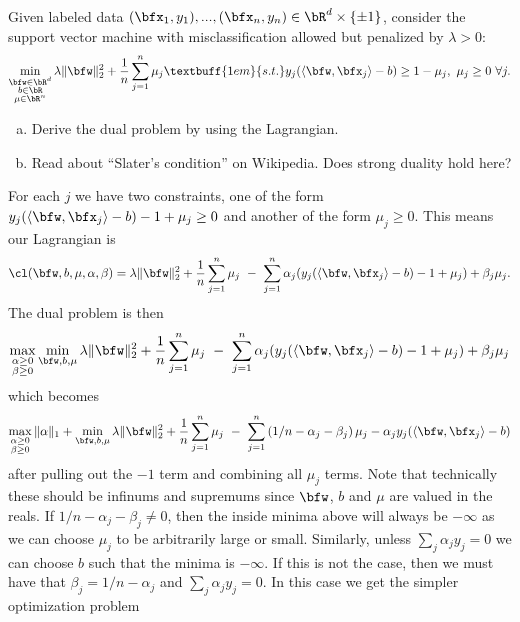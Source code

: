 \begin{homework}[e]
  \prob Given labeled data $(\bfx_1,y_1),...,(\bfx_n,y_n)\in \bR^d \times \{\pm 1\}$, consider the support vector machine with misclassification allowed but penalized by $\lambda > 0$:
  \begin{align*}
    \min_{\substack{\bfw\in \bR^d\\ b\in \bR\\\mu\in \bR^n}} \lambda \|\bfw\|^2_2 + \frac{1}{n}\sum^n_{j=1} \mu_j \textbuff{1em}{s.t.} y_j(\langle \bfw, \bfx_j \rangle - b) \geq 1 - \mu_j, ~ \mu_j \geq 0 ~\forall j.
  \end{align*}
  \begin{enumerate}[(a)]
    \item Derive the dual problem by using the Lagrangian.
    \item Read about ``Slater's condition'' on Wikipedia. Does strong duality hold here?
  \end{enumerate}
  \begin{prf}
    For each $j$ we have two constraints, one of the form $y_j(\langle \bfw, \bfx_j \rangle - b) - 1 + \mu_j\geq 0$ and another of the form $\mu_j \geq 0$. This means our Lagrangian is
    \begin{align*}
      \cl(\bfw, b,\mu,\alpha,\beta) = \lambda \|\bfw\|^2_2 + \frac{1}{n} \sum_{j=1}^n \mu_j ~-~ \sum_{j=1}^n \alpha_j(y_j(\langle \bfw, \bfx_j\rangle - b) -1 + \mu_j) + \beta_j\mu_j.
    \end{align*}
    The dual problem is then
    \begin{align*}
      \max_{\substack{\alpha \geq 0 \\ \beta\geq 0}} \min_{\bfw, b, \mu} \lambda \|\bfw\|^2_2 + \frac{1}{n}\sum_{j=1}^n\mu_j ~-~\sum_{j=1}^n \alpha_j(y_j(\langle \bfw, \bfx_j\rangle - b) -1 + \mu_j) + \beta_j\mu_j
    \end{align*}
    which becomes
    \begin{align*} 
      \max_{\substack{\alpha \geq 0 \\ \beta\geq 0}} \|\alpha\|_1 + \min_{\bfw, b, \mu} \lambda \|\bfw\|^2_2 + \frac{1}{n}\sum_{j=1}^n\mu_j ~-~\sum_{j=1}^n \left(1/n - \alpha_j - \beta_j\right)\mu_j - \alpha_jy_j(\langle \bfw,\bfx_j \rangle - b)\\
    \end{align*}
    after pulling out the $-1$ term and combining all $\mu_j$ terms. Note that technically these should be infinums and supremums since $\bfw$, $b$ and $\mu$ are valued in the reals. If $1/n - \alpha_j - \beta_j\neq 0$, then the inside minima above will always be $-\infty$ as we can choose $\mu_j$ to be arbitrarily large or small. Similarly, unless $\sum_j\alpha_jy_j = 0$ we can choose $b$ such that the minima is $-\infty$. If this is not the case, then we must have that $\beta_j = 1/n - \alpha_j$ and $\sum_j\alpha_jy_j = 0$. In this case we get the simpler optimization problem

\end{prf}
\end{homework}
